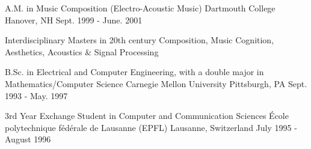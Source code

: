

\begin{cventries}

  \cventry
    {A.M. in Music Composition (Electro-Acoustic Music)} %
    {Dartmouth College} %
    {Hanover, NH} %
    {Sept. 1999 - June. 2001} %
    {
      \begin{cvitems} %
        \item {Interdisciplinary Masters in 20th century Composition, Music Cognition, Aesthetics, Acoustics \& Signal Processing}
      \end{cvitems}
    }

  \cventry
    {B.Sc. in Electrical and Computer Engineering, with a double major in Mathematics/Computer Science} %
    {Carnegie Mellon University} %
    {Pittsburgh, PA} %
    {Sept. 1993 - May. 1997} %
    {
      \begin{cvitems} %
      \end{cvitems}
    }
    
  \cventry
    {3rd Year Exchange Student in Computer and Communication Sciences} %
    {{\'E}cole polytechnique f{\'e}d{\'e}rale de Lausanne (EPFL)} %
    {Lausanne, Switzerland} %
    {July 1995 - August 1996} %
    {
      \begin{cvitems} %
      \end{cvitems}
    }
    
\end{cventries}
